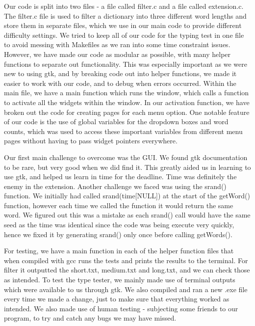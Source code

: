 \documentclass{article}
\begin{document}
Our code is split into two files - a file called filter.c and a file called extension.c. The filter.c file is used to filter a dictionary into three different word lengths and store them in separate files, which we use in our main code to provide different difficulty settings. We tried to keep all of our code for the typing test in one file to avoid messing with Makefiles as we ran into some time constraint issues. However, we have made our code as modular as possible, with many helper functions to separate out functionality. This was especially important as we were new to using gtk, and by breaking code out into helper functions, we made it easier to work with our code, and to debug when errors occurred. Within the main file, we have a main function which runs the window, which calls a function to activate all the widgets within the window. In our activation function, we have broken out the code for creating pages for each menu option. One notable feature of our code is the use of global variables for the dropdown boxes and word counts, which was used to access these important variables from different menu pages without having to pass widget pointers everywhere.

Our first main challenge to overcome was the GUI. We found gtk documentation to be rare, but very good when we did find it. This greatly aided us in learning to use gtk, and helped us learn in time for the deadline. Time was definitely the enemy in the extension. Another challenge we faced was using the srand() function. We initially had called srand(time[NULL]) at the start of the getWord() function, however each time we called the function it would return the same word. We figured out this was a mistake as each srand() call would have the same seed as the time was identical since the code was being execute very quickly, hence we fixed it by generating srand() only once before calling getWords().

For testing, we have a main function in each of the helper function files that when compiled with gcc runs the tests and prints the results to the terminal. For filter it outputted the short.txt, medium.txt and long.txt, and we can check those as intended. To test the type tester, we mainly made use of terminal outputs which were available to us through gtk. We also compiled and ran a new .exe file every time we made a change, just to make sure that everything worked as intended. We also made use of human testing - subjecting some friends to our program, to try and catch any bugs we may have missed.
\end{document}
